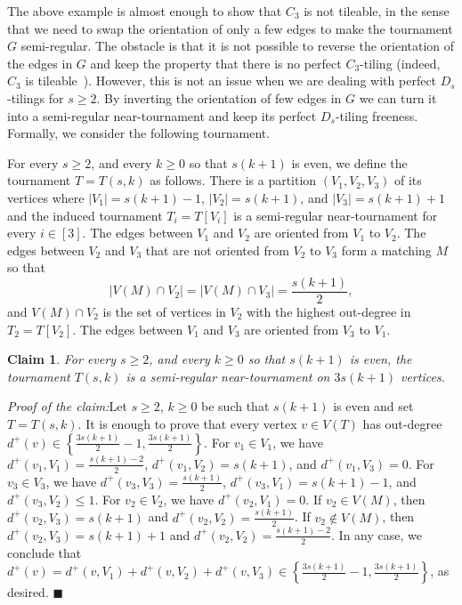 \documentclass[11pt]{amsart}
\newtheorem{claim}[theorem]{Claim}
\newenvironment{claimproof}[1]{\par\noindent\textit{Proof of the claim:}\space#1}{\leavevmode\unskip\penalty9999 \hbox{}\nobreak\hfill\quad\hbox{$\blacksquare$}}
\begin{document}
The above example is almost enough to show that $C_3$ is not tileable, in the sense that we need to swap the orientation of only a few edges to make the tournament $G$ semi-regular. The obstacle is that it is not possible to reverse the orientation of the edges in $G$ and keep the property that there is no perfect $C_3$-tiling (indeed, $C_3$ is tileable~\cite{li-molla}). However, this is not an issue when we are dealing with perfect $D_s$-tilings for $s\ge 2$. By inverting the orientation of few edges in $G$ we can turn it into a semi-regular near-tournament and keep its perfect $D_s$-tiling freeness. Formally, we consider the following tournament.

For every $s\ge 2$, and every $k \ge 0$ so that $s(k+1)$ is even, we define the tournament $T=T(s,k)$ as follows. There is a partition $(V_1, V_2, V_3)$ of its vertices where $|V_1|=s(k+1)-1$, $|V_2|=s(k+1)$, and $|V_3|=s(k+1)+1$ and the induced tournament $T_i=T[V_i]$ is a semi-regular near-tournament for every $i \in [3]$. 
The edges between $V_1$ and $V_2$ are oriented from $V_1$ to $V_2$. 
The edges between $V_2$ and $V_3$ that are not oriented from $V_2$ to $V_3$ form a matching $M$ so that $$|V(M)\cap V_2|=|V(M)\cap V_3|=\frac{s(k+1)}{2},$$ and $V(M)\cap V_2$ is the set of vertices in $V_2$ with the highest out-degree in $T_2=T[V_2]$.
The edges between $V_1$ and $V_3$ are oriented from $V_3$ to $V_1$.

\begin{claim}
    For every $s\ge 2$, and every $k \ge 0$ so that $s(k+1)$ is even, the tournament $T(s,k)$ is a semi-regular near-tournament on $3s(k+1)$ vertices.
\end{claim}

\begin{claimproof}
    Let $s\ge 2$, $k \ge 0$ be such that $s(k+1)$ is even and set $T=T(s,k)$. It is enough to prove that every vertex $v \in V(T)$ has out-degree $d^+(v) \in \left\{ \frac{3s(k+1)}{2}-1, \frac{3s(k+1)}{2} \right\}$. 
    For $v_1 \in V_1$, we have $d^+(v_1, V_1) = \frac{s(k+1)-2}{2}$, $d^+(v_1, V_2) = s(k+1)$, and $d^+(v_1, V_3)=0$.
    For $v_3 \in V_3$, we have $d^+(v_3, V_3) = \frac{s(k+1)}{2} $, $d^+(v_3, V_1) = s(k+1)-1$, and $d^+(v_3, V_2) \le 1$.
    For $v_2 \in V_2$, we have $d^+(v_2, V_1) = 0$.
    If $v_2 \in V(M)$, then $d^+(v_2, V_3) = s(k+1)$ and $d^+(v_2, V_2) = \frac{s(k+1)}{2}$.
    If $v_2 \not\in V(M)$, then $d^+(v_2, V_3) = s(k+1)+1$ and $d^+(v_2, V_2) = \frac{s(k+1)-2}{2}$.
    In any case, we conclude that $d^+(v) = d^+(v, V_1)+d^+(v, V_2)+d^+(v, V_3) \in \left\{ \frac{3s(k+1)}{2}-1, \frac{3s(k+1)}{2} \right\}$, as desired.
\end{claimproof}
\end{document}
